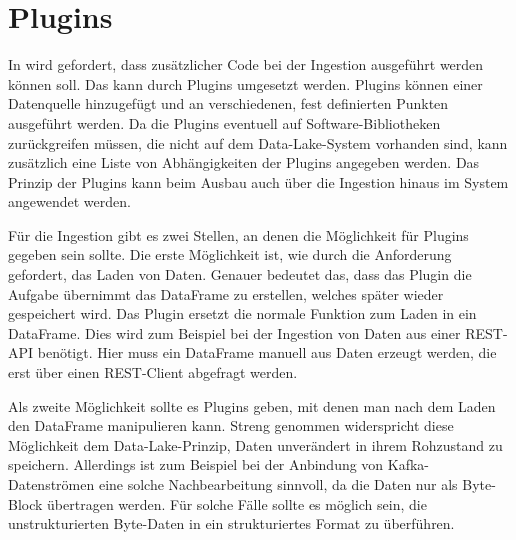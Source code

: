 \section{Plugins}

In  wird gefordert, dass zusätzlicher Code bei der Ingestion ausgeführt werden können soll.
Das kann durch Plugins umgesetzt werden.
Plugins können einer Datenquelle hinzugefügt und an verschiedenen, fest definierten Punkten ausgeführt werden.
Da die Plugins eventuell auf Software-Bibliotheken zurückgreifen müssen, die nicht auf dem Data-Lake-System vorhanden sind, kann zusätzlich eine Liste von Abhängigkeiten der Plugins angegeben werden.
Das Prinzip der Plugins kann beim Ausbau auch über die Ingestion hinaus im System angewendet werden.

Für die Ingestion gibt es zwei Stellen, an denen die Möglichkeit für Plugins gegeben sein sollte.
Die erste Möglichkeit ist, wie durch die Anforderung gefordert, das Laden von Daten.
Genauer bedeutet das, dass das Plugin die Aufgabe übernimmt das DataFrame zu erstellen, welches später wieder gespeichert wird.
Das Plugin ersetzt die normale Funktion zum Laden in ein DataFrame.
Dies wird zum Beispiel bei der Ingestion von Daten aus einer REST-API benötigt.
Hier muss ein DataFrame manuell aus Daten erzeugt werden, die erst über einen REST-Client abgefragt werden.

Als zweite Möglichkeit sollte es Plugins geben, mit denen man nach dem Laden den DataFrame manipulieren kann.
Streng genommen widerspricht diese Möglichkeit dem Data-Lake-Prinzip, Daten unverändert in ihrem Rohzustand zu speichern.
Allerdings ist zum Beispiel bei der Anbindung von Kafka-Datenströmen eine solche Nachbearbeitung sinnvoll, da die Daten nur als Byte-Block übertragen werden.
Für solche Fälle sollte es möglich sein, die unstrukturierten Byte-Daten in ein strukturiertes Format zu überführen.